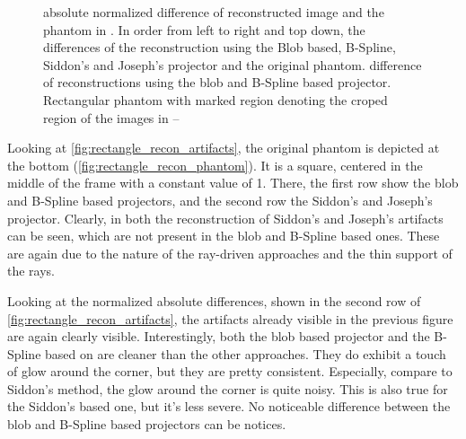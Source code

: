 \begin{figure}[h]
{		absolute normalized difference of reconstructed image and the phantom in
		. In order from left to right and top down, the
		differences of the reconstruction using the Blob based, B-Spline, Siddon's and
		Joseph's projector and the original phantom.
		 difference of reconstructions
		using the blob and B-Spline based projector. 
		Rectangular phantom with marked region denoting the croped region of the images in
		--
	}%
	\label{fig:rectangle_recon_artifacts}
\end{figure}

Looking at \autoref{fig:rectangle_recon_artifacts}, the original phantom is depicted at the bottom
(\autoref{fig:rectangle_recon_phantom}). It is a square, centered in the middle of the frame with a
constant value of 1. There, the first row show the blob and B-Spline based projectors, and the
second row the Siddon's and Joseph's projector. Clearly, in both the reconstruction of Siddon's and
Joseph's artifacts can be seen, which are not present in the blob and B-Spline based ones. These are
again due to the nature of the ray-driven approaches and the thin support of the rays.

Looking at the normalized absolute differences, shown in the second row of
\autoref{fig:rectangle_recon_artifacts}, the artifacts already visible in the previous figure are
again clearly visible. Interestingly, both the blob based projector and the B-Spline based on are
cleaner than the other approaches. They do exhibit a touch of glow around the corner, but they are
pretty consistent. Especially, compare to Siddon's method, the glow around the corner is quite
noisy. This is also true for the Siddon's based one, but it's less severe.  No noticeable difference between the blob and B-Spline based projectors can be
notices.

